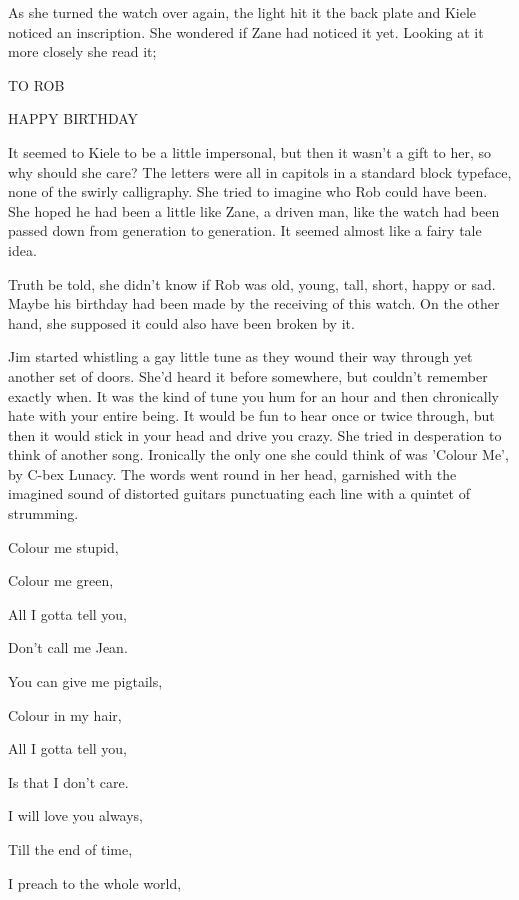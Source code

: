 As she turned the watch over again, the light hit it the back plate and Kiele noticed an inscription.  She wondered if Zane had noticed it yet.  Looking at it more closely she read it;



TO ROB

HAPPY BIRTHDAY



It seemed to Kiele to be a little impersonal, but then it wasn't a gift to her, so why should she care?  The letters were all in capitols in a standard block typeface, none of the swirly calligraphy.  She tried to imagine who Rob could have been.  She hoped he had been a little like Zane, a driven man, like the watch had been passed down from generation to generation.  It seemed almost like a fairy tale idea. 

Truth be told, she didn't know if Rob was old, young, tall, short, happy or sad.  Maybe his birthday had been made by the receiving of this watch.  On the other hand, she supposed it could also have been broken by it.  

Jim started whistling a gay little tune as they wound their way through yet another set of doors.  She'd heard it before somewhere, but couldn't remember exactly when.  It was the kind of tune you hum for an hour and then chronically hate with your entire being.  It would be fun to hear once or twice through, but then it would stick in your head and drive you crazy.  She tried in desperation to think of another song.  Ironically the only one she could think of was 'Colour Me', by C-bex Lunacy.  The words went round in her head, garnished with the imagined sound of distorted guitars punctuating each line with a quintet of strumming.



Colour me stupid, 

Colour me green, 

All I gotta tell you, 

Don't call me Jean. 



You can give me pigtails, 

Colour in my hair, 

All I gotta tell you, 

Is that I don't care. 



I will love you always, 

Till the end of time, 

I preach to the whole world, 

